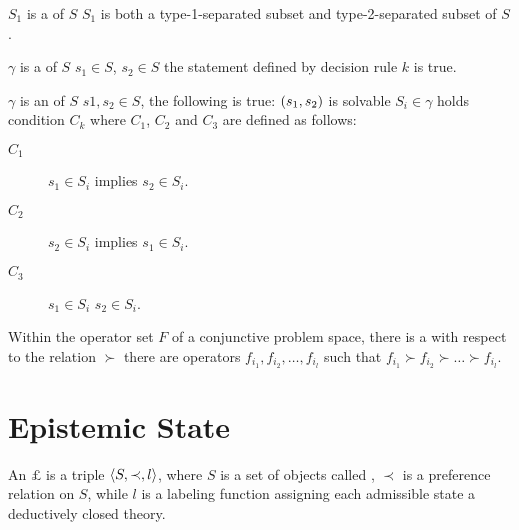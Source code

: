 \begin{defi}
$S_1$ is a  of $S$ \iffTx{} $S_1$ is both a type-1-separated subset and type-2-separated subset of $S$.
\cite{conf/ijcai/Florath75}
\end{defi}

\begin{defi}
$\gamma$ is a  of $S$ \iffTx{} \faTx{} $s_1\in S$, $s_2\in S$ the statement defined by decision rule $k$ is true.
\cite{conf/ijcai/Florath75}
\end{defi}

\begin{defi}
$\gamma$ is an  of $S$ \iffTx{} \faTx{} $s1,s_2\in S$, the following is true: $\left( s_1,s_2\right)$ is solvable \iffTx{} \faTx{} $S_i\in\gamma$ holds condition $C_k$ where $C_1$, $C_2$ and $C_3$ are defined as follows:
\begin{description}
 \item [$C_1$] $s_1\in S_i$ implies $s_2\in S_i$.
 \item [$C_2$] $s_2\in S_i$ implies $s_1\in S_i$.
 \item [$C_3$] $s_1\in S_i$ \iffTx{} $s_2\in S_i$.
\end{description}
\cite{conf/ijcai/Florath75}
\end{defi}

\begin{defi}
Within the operator set $F$ of a conjunctive problem space, there is a  with respect to the relation $\succ$ \iffTx{} there are operators $f_{i_1},f_{i_2},\ldots,f_{i_l}$ such that $f_{i_1}\succ f_{i_2}\succ\ldots\succ f_{i_l}$.
\cite{conf/ijcai/Florath75}
\end{defi}

\section{Epistemic State}

\begin{defi}
An  $\pounds$ is a triple $\left\langle S,\prec,l\right\rangle$, where $S$ is a set of objects called , $\prec$ is a preference relation on $S$, while $l$ is a labeling function assigning each admissible state a deductively closed theory.
\cite{conf/ijcai/Bochman99}
\end{defi}

